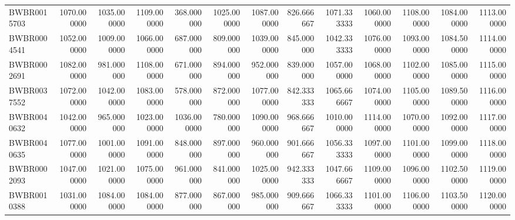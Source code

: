 \begin{longtable}{lrrrrrrrrrrrr}
BWBR0015703 & 1070.000000 & 1035.000000 & 1109.000000 & 368.000000 & 1025.000000 & 1087.000000 & 826.666667 & 1071.333333 & 1060.000000 & 1108.000000 & 1084.000000 & 1113.000000 \\
BWBR0004541 & 1052.000000 & 1009.000000 & 1066.000000 & 687.000000 & 809.000000 & 1039.000000 & 845.000000 & 1042.333333 & 1076.000000 & 1093.000000 & 1084.500000 & 1114.000000 \\
BWBR0002691 & 1082.000000 & 981.000000 & 1108.000000 & 671.000000 & 894.000000 & 952.000000 & 839.000000 & 1057.000000 & 1068.000000 & 1102.000000 & 1085.000000 & 1115.000000 \\
BWBR0037552 & 1072.000000 & 1042.000000 & 1083.000000 & 578.000000 & 872.000000 & 1077.000000 & 842.333333 & 1065.666667 & 1074.000000 & 1105.000000 & 1089.500000 & 1116.000000 \\
BWBR0040632 & 1042.000000 & 965.000000 & 1023.000000 & 1036.000000 & 780.000000 & 1090.000000 & 968.666667 & 1010.000000 & 1114.000000 & 1070.000000 & 1092.000000 & 1117.000000 \\
BWBR0040635 & 1077.000000 & 1001.000000 & 1091.000000 & 848.000000 & 897.000000 & 960.000000 & 901.666667 & 1056.333333 & 1097.000000 & 1101.000000 & 1099.000000 & 1118.000000 \\
BWBR0002093 & 1047.000000 & 1021.000000 & 1075.000000 & 961.000000 & 841.000000 & 1025.000000 & 942.333333 & 1047.666667 & 1109.000000 & 1096.000000 & 1102.500000 & 1119.000000 \\
BWBR0010388 & 1031.000000 & 1084.000000 & 1084.000000 & 877.000000 & 867.000000 & 985.000000 & 909.666667 & 1066.333333 & 1101.000000 & 1106.000000 & 1103.500000 & 1120.000000 \\
\end{longtable}
